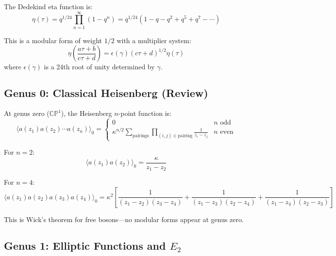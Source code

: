 \begin{definition}\label{def:eta-function}
The Dedekind eta function is:
\begin{equation}
\eta(\tau) = q^{1/24} \prod_{n=1}^{\infty} (1 - q^n) 
= q^{1/24}(1 - q - q^2 + q^5 + q^7 - \cdots)
\end{equation}

This is a modular form of weight $1/2$ with a multiplier system:
\begin{equation}
\eta\left(\frac{a\tau+b}{c\tau+d}\right) = \epsilon(\gamma) (c\tau + d)^{1/2} \eta(\tau)
\end{equation}
where $\epsilon(\gamma)$ is a 24th root of unity determined by $\gamma$.
\end{definition}

\subsection{Genus 0: Classical Heisenberg (Review)}
\label{subsec:heisenberg-genus-zero}

\begin{theorem}\label{thm:heisenberg-genus-zero}
At genus zero ($\mathbb{CP}^1$), the Heisenberg $n$-point function is:
\begin{equation}
\langle a(z_1) a(z_2) \cdots a(z_n) \rangle_0 = 
\begin{cases}
0 & n \text{ odd} \\
\kappa^{n/2} \sum_{\text{pairings}} \prod_{(i,j) \in \text{pairing}} \frac{1}{z_i - z_j} 
& n \text{ even}
\end{cases}
\end{equation}

For $n=2$:
$$\langle a(z_1) a(z_2) \rangle_0 = \frac{\kappa}{z_1 - z_2}$$

For $n=4$:
$$\langle a(z_1) a(z_2) a(z_3) a(z_4) \rangle_0 = \kappa^2 \left[
\frac{1}{(z_1-z_2)(z_3-z_4)} + \frac{1}{(z_1-z_3)(z_2-z_4)} + 
\frac{1}{(z_1-z_4)(z_2-z_3)}
\right]$$

This is Wick's theorem for free bosons---no modular forms appear at genus zero.
\end{theorem}

\subsection{Genus 1: Elliptic Functions and $E_2$}
\label{subsec:heisenberg-genus-one-complete}

